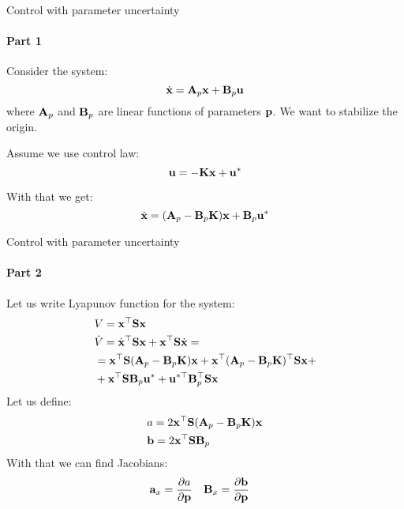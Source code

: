 \documentclass{beamer}
\begin{document}
\begin{frame}{Control with parameter uncertainty}
\framesubtitle{Part 1}
\begin{flushleft}

Consider the system:
%
\begin{equation}
    \dot{\mathbf{x}} = \mathbf{A}_p\mathbf{x} + \mathbf{B}_p\mathbf{u}
\end{equation}
%
where $\mathbf{A}_p$ and $\mathbf{B}_p$ are linear functions of parameters $\mathbf{p}$. We want to stabilize the origin.

\bigskip

Assume we use control law:
%
\begin{equation}
    \mathbf{u} = -\mathbf{K}\mathbf{x} + \mathbf{u}^*
\end{equation}

With that we get:
%
\begin{equation}
   \dot{\mathbf{x}} = (\mathbf{A}_p - \mathbf{B}_p\mathbf{K})\mathbf{x} + \mathbf{B}_p\mathbf{u}^*
\end{equation}


 
\end{flushleft}
\end{frame}



\begin{frame}{Control with parameter uncertainty}
\framesubtitle{Part 2}
\begin{flushleft}

Let us write Lyapunov function for the system:
%
\begin{align}
    & V = \mathbf{x}^\top \mathbf{S} \mathbf{x} \\
    & \dot{V} = \dot{\mathbf{x}}^\top \mathbf{S} \mathbf{x} + \mathbf{x}^\top \mathbf{S} \dot{\mathbf{x}} 
    = \\
    & = \mathbf{x}^\top \mathbf{S}(\mathbf{A}_p - \mathbf{B}_p\mathbf{K})\mathbf{x}
    + \mathbf{x}^\top (\mathbf{A}_p - \mathbf{B}_p\mathbf{K})^\top
    \mathbf{S} \mathbf{x}
    + \\
    & + \mathbf{x}^\top \mathbf{S} \mathbf{B}_p \mathbf{u}^*
    +
    \mathbf{u}^{*\top} \mathbf{B}_p^\top \mathbf{S} \mathbf{x}
\end{align}
%
Let us define:
%
\begin{align}
    & a = 2\mathbf{x}^\top \mathbf{S}(\mathbf{A}_p - \mathbf{B}_p\mathbf{K})\mathbf{x} \\
    & \mathbf{b} = 2\mathbf{x}^\top \mathbf{S} \mathbf{B}_p
\end{align}
%
With that we can find Jacobians:
%
\begin{align}
    & \mathbf{a}_x = \frac{\partial a}{\partial \mathbf{p}} &
    & \mathbf{B}_x = \frac{\partial \mathbf{b}}{\partial \mathbf{p}}
\end{align}

\end{flushleft}
\end{frame}
\end{document}
